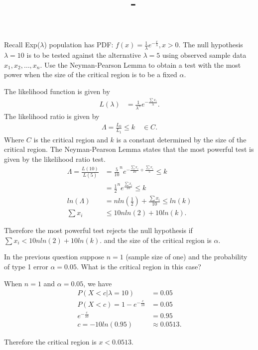 \documentclass[answers,12pt,addpoints]{exam}
\author{\name}
\title{\course \ - \assignment}
\begin{document}
\maketitle


\newpage
\begin{questions}
    \question Recall Exp($\lambda$) population has PDF: $f(x) = \frac{1}{\lambda} e^{-\frac{x}{\lambda}}, x > 0$. The null hypothesis $\lambda = 10$ is to be tested against the alternative $\lambda = 5$ using observed sample data $x_1, x_2, \ldots, x_n$. Use the Neyman-Pearson Lemma to obtain a test with the most power when the size of the critical region is to be a fixed $\alpha$.

    \begin{solution}
        The likelihood function is given by
        \begin{align*}
            L(\lambda) &= \frac{1}{\lambda^n} e^{-\frac{\sum x_i}{\lambda}}.
        \end{align*}
        The likelihood ratio is given by
        \begin{align*}
            \Lambda = \frac{L_0}{L_1} \leq k \quad \in C.
        \end{align*}
        Where $C$ is the critical region and $k$ is a constant determined by the size of the critical region. The Neyman-Pearson Lemma states that the most powerful test is given by the likelihood ratio test. 
        \begin{align*}
            \Lambda = \frac{L(10)}{L(5)} &= \frac{5}{10}^ne^{-\frac{\sum x_i}{10} + \frac{\sum x_i}{5}} \leq k\\
            &= \frac{1}{2}^ne^{\frac{\sum x_i}{10}} \leq k\\
            ln(\Lambda) &= n ln(\frac{1}{2}) + \frac{\sum x_i}{10} \leq ln(k)\\
            \sum x_i &\leq 10n ln(2) + 10 ln(k).
        \end{align*}

        Therefore the most powerful test rejects the null hypothesis if $\sum x_i < 10n ln(2) + 10 ln(k)$.
        and the size of the critical region is $\alpha$.

    \end{solution}

    \question In the previous question suppose $n = 1$ (sample size of one) and the probability of type 1 error $\alpha = 0.05$. What is the critical region in this case?
    \begin{solution}
        When $n=1$ and $\alpha = 0.05$, we have
        \begin{align*}
            P(X < c | \lambda = 10) &= 0.05\\
            P(X < c) = 1 - e^{-\frac{c}{10}} &= 0.05\\
            e^{-\frac{c}{10}} &= 0.95\\
            c = -10 ln(0.95) &\approx 0.0513.
        \end{align*}

        Therefore the critical region is $x < 0.0513$.

    \end{solution}
\end{questions}
\end{document}
